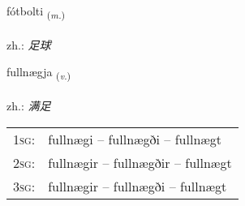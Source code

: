 \documentclass[frontgrid, backgrid]{flacards}\usepackage[]{graphicx}\usepackage[]{xcolor}
\begin{document}
\renewcommand{\blhead}{\vskip5pt {\small\bfseries\footnotesize Nafnorð | 名词 }}
\renewcommand{\bcfoot}{\vskip5pt \hspace{2pt}{\small\bfseries\footnotesize 3K}}


{fótbolti \small{\textsubscript{(\textit{m.})}} \\[1ex] %
\textphonetic{[fouːtpɔl̥tɪ]} \\
zh.: \emph{足球} \\  [2ex]
\renewcommand*{\arraystretch}{0.8}
}

\renewcommand{\flhead}{\vskip5pt \fboxsep=0pt {\small\bfseries\footnotesize Sagnorð | 动词}}
\renewcommand{\fcfoot}{\vskip5pt \fboxsep=0pt \hspace{2pt}{\small\bfseries\footnotesize 3K}}

\renewcommand{\blhead}{\vskip5pt {\small\bfseries\footnotesize Sagnorð | 动词 }}
\renewcommand{\bcfoot}{\vskip5pt \hspace{2pt}{\small\bfseries\footnotesize 3K}}


{fullnægja \small{\textsubscript{(\textit{v.})}} \\[1ex] %
\textphonetic{[fʏtlnaija]} \\
zh.: \emph{满足} \\  [2ex]
\renewcommand*{\arraystretch}{0.8}
\begin{tabular}{p{1cm}l}
\textsc{1sg}: & fullnægi -- fullnægði -- fullnægt \\ 
\textsc{2sg}: & fullnægir -- fullnægðir -- fullnægt \\ 
\textsc{3sg}: & fullnægir -- fullnægði -- fullnægt \\ 
\end{tabular}
}
\end{document}
